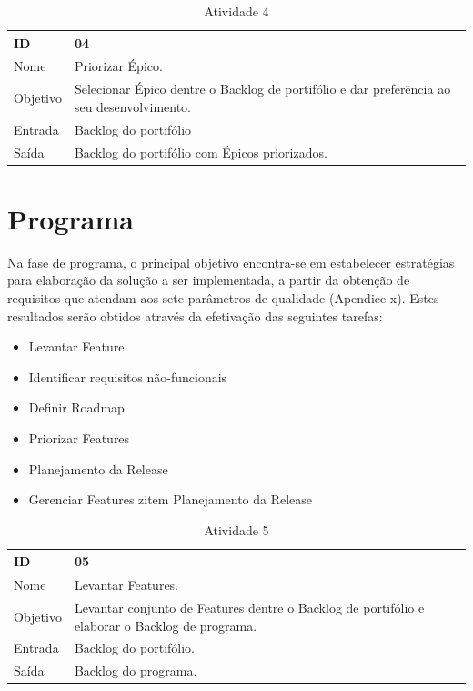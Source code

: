 \begin{table}[\htp]
\centering
\caption{Atividade 4}
\label{my-label}
\begin{tabular}{|l|l|}
\hline
ID       & 04                                                \\ \hline
Nome     & Priorizar Épico. \\ \hline
Objetivo & Selecionar Épico dentre o Backlog de portifólio e dar preferência ao seu desenvolvimento.
 \\ \hline
Entrada  &  Backlog do portifólio \\ \hline
Saída    & Backlog do portifólio com Épicos priorizados. \\ \hline
\end{tabular}
\end{table}

\section{Programa}

Na fase de programa, o principal objetivo encontra-se em estabelecer estratégias para elaboração da solução a ser implementada, a partir da obtenção de requisitos que atendam aos sete parâmetros de qualidade (Apendice x). Estes resultados serão obtidos através da efetivação das seguintes tarefas:

\begin{itemize}
\item Levantar Feature
\item Identificar requisitos não-funcionais
\item Definir Roadmap
\item Priorizar Features
\item Planejamento da Release
\item Gerenciar Features
zitem Planejamento da Release
\end{itemize}

\begin{table}[\htp]
\centering
\caption{Atividade 5}
\label{my-label}
\begin{tabular}{|l|l|}
\hline
ID       & 05                                               \\ \hline
Nome     & Levantar Features. \\ \hline
Objetivo & Levantar conjunto de Features dentre o Backlog de portifólio e elaborar o Backlog de programa.
 \\ \hline
Entrada  &  Backlog do portifólio. \\ \hline
Saída    & Backlog do programa. \\ \hline
\end{tabular}
\end{table}

